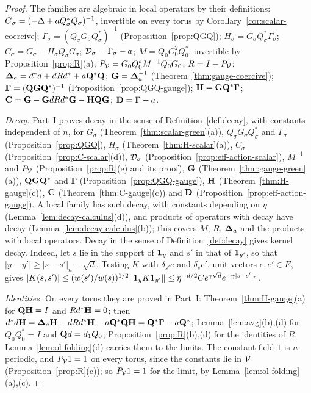 \begin{proof}
The families are algebraic in local operators by their definitions: $G_\sigma=(-\Delta+aQ_\sigma^*Q_\sigma)^{-1}$, invertible on every torus by Corollary~\ref{cor:scalar-coercive}; $\Gamma_\sigma=(Q_\sigma G_\sigma Q_\sigma^*)^{-1}$ (Proposition~\ref{prop:QGQ}); $H_\sigma=G_\sigma Q_\sigma^*\Gamma_\sigma$; $C_\sigma=G_\sigma-H_\sigma Q_\sigma G_\sigma$; $\mathcal D_\sigma=\Gamma_\sigma-a$; $M=Q_0G_0^2Q_0^*$, invertible by Proposition~\ref{prop:R}(a); $P_\mathcal V=G_0Q_0^*M^{-1}Q_0G_0$; $R=I-P_\mathcal V$; $\boldsymbol{\Delta}_a=d^*d+dRd^*+a\mathbf Q^*\mathbf Q$; $\mathbf G=\boldsymbol{\Delta}_a^{-1}$ (Theorem~\ref{thm:gauge-coercive}); $\boldsymbol\Gamma=(\mathbf Q\mathbf G\mathbf Q^*)^{-1}$ (Proposition~\ref{prop:QGQ-gauge}); $\mathbf H=\mathbf G\mathbf Q^*\boldsymbol\Gamma$; $\mathbf C=\mathbf G-\mathbf G dRd^*\mathbf G-\mathbf H\mathbf Q\mathbf G$; $\mathbf D=\boldsymbol\Gamma-a$.

\emph{Decay.} Part~I proves decay in the sense of Definition~\ref{def:decay}, with constants independent of $n$, for $G_\sigma$ (Theorem~\ref{thm:scalar-green}(a)), $Q_\sigma G_\sigma Q_\sigma^*$ and $\Gamma_\sigma$ (Proposition~\ref{prop:QGQ}), $H_\sigma$ (Theorem~\ref{thm:H-scalar}(a)), $C_\sigma$ (Proposition~\ref{prop:C-scalar}(d)), $\mathcal D_\sigma$ (Proposition~\ref{prop:eff-action-scalar}), $M^{-1}$ and $P_\mathcal V$ (Proposition~\ref{prop:R}(e) and its proof), $\mathbf G$ (Theorem~\ref{thm:gauge-green}(a)), $\mathbf Q\mathbf G\mathbf Q^*$ and $\boldsymbol\Gamma$ (Proposition~\ref{prop:QGQ-gauge}), $\mathbf H$ (Theorem~\ref{thm:H-gauge}(c)), $\mathbf C$ (Theorem~\ref{thm:C-gauge}(c)) and $\mathbf D$ (Proposition~\ref{prop:eff-action-gauge}). A local family has such decay, with constants depending on $\eta$ (Lemma~\ref{lem:decay-calculus}(d)), and products of operators with decay have decay (Lemma~\ref{lem:decay-calculus}(b)); this covers $M$, $R$, $\boldsymbol{\Delta}_a$ and the products with local operators. Decay in the sense of Definition~\ref{def:decay} gives kernel decay. Indeed, let $s$ lie in the support of $\mathbf 1_y$ and $s'$ in that of $\mathbf 1_{y'}$, so that $|y-y'|\ge|s-s'|_n-\sqrt d$. Testing $K$ with $\delta_{s'}e$ and $\delta_se'$, unit vectors $e,e'\in E$, gives $|K(s,s')|\le(w(s')/w(s))^{1/2}\|\mathbf 1_yK\mathbf 1_{y'}\|\le\eta^{-d/2}Ce^{\gamma\sqrt d}e^{-\gamma|s-s'|_n}$.

\emph{Identities.} On every torus they are proved in Part~I: Theorem~\ref{thm:H-gauge}(a) for $\mathbf Q\mathbf H=I$ and $Rd^*\mathbf H=0$; then $d^*d\mathbf H=\boldsymbol{\Delta}_a\mathbf H-dRd^*\mathbf H-a\mathbf Q^*\mathbf Q\mathbf H=\mathbf Q^*\boldsymbol\Gamma-a\mathbf Q^*$; Lemma~\ref{lem:avg}(b),(d) for $Q_0Q_0^*=I$ and $\mathbf Q d=d_1 Q_0$; Proposition~\ref{prop:R}(b),(d) for the identities of $R$. Lemma~\ref{lem:ol-folding}(d) carries them to the limits. The constant field $1$ is $n$-periodic, and $P_\mathcal V1=1$ on every torus, since the constants lie in $\mathcal V$ (Proposition~\ref{prop:R}(c)); so $P_\mathcal V1=1$ for the limit, by Lemma~\ref{lem:ol-folding}(a),(c).
\end{proof}

